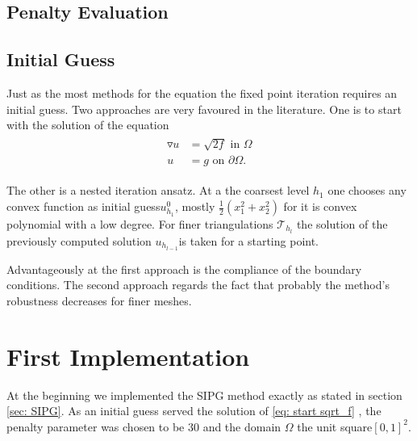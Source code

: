 \subsection{Penalty Evaluation}

\subsection{Initial Guess}
Just as the most methods for the \MA equation the fixed point iteration requires an initial guess. Two approaches are very favoured in the literature.
One is to start with the solution of the equation
\begin{align}
	\begin{split}
	\triangledown u &= \sqrt{2f} \text{ in } \Omega \\ 
	u &= g \text{ on }\partial \Omega.
	\end{split}\label{eq: start sqrt_f}
\end{align}


The other is a nested iteration ansatz. At a the coarsest level $h_1$ one chooses any convex function as initial guess$u^0_{h_1}$, mostly $\frac 1 2 ({x_1^2} + {x_2^2}) $ for it is convex polynomial with a low degree. For finer triangulations $\mathcal{T}_{h_{l}}$ the solution of the previously computed solution $u_{h_{l-1}}$is taken for a starting point.

Advantageously at the first approach is the compliance of the boundary conditions.
The second approach regards the fact that probably the method's robustness decreases for finer meshes.


\section{First Implementation}
At the beginning we implemented the SIPG method exactly as stated in section \ref{sec: SIPG}.
As an initial guess served the solution of \eqref{eq: start sqrt_f} , the penalty parameter was chosen to be 30 and the domain $\Omega$ the unit square$[0,1]^2$.

